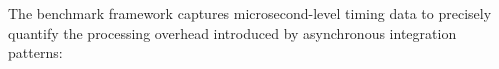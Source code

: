 The benchmark framework captures microsecond-level timing data to precisely quantify the processing overhead introduced by asynchronous integration patterns:


